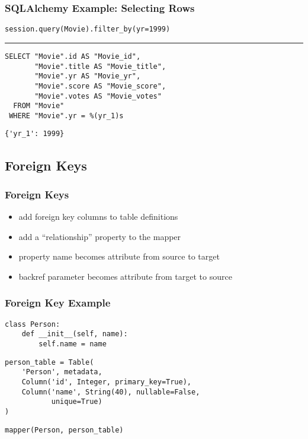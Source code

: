 \documentclass[dvipsnames]{beamer}
\theoremstyle{plain}
\begin{document}
\begin{frame}[fragile]
  \frametitle{SQLAlchemy Example: Selecting Rows}

  \begin{lstlisting}
session.query(Movie).filter_by(yr=1999)
  \end{lstlisting}
  \hrule

  \begin{lstlisting}[language=FullSQL]
SELECT "Movie".id AS "Movie_id",
       "Movie".title AS "Movie_title",
       "Movie".yr AS "Movie_yr",
       "Movie".score AS "Movie_score",
       "Movie".votes AS "Movie_votes"
  FROM "Movie"
 WHERE "Movie".yr = %(yr_1)s
  \end{lstlisting}

  \begin{lstlisting}
{'yr_1': 1999}
  \end{lstlisting}
\end{frame}

\subsection{Foreign Keys}

\begin{frame}
  \frametitle{Foreign Keys}

  \begin{itemize}
    \item add foreign key columns to table definitions
    \item add a ``relationship'' property to the mapper
    \item property name becomes attribute from source to target
    \item backref parameter becomes attribute from target to source
  \end{itemize}
\end{frame}

\begin{frame}[fragile]
  \frametitle{Foreign Key Example}

  \begin{lstlisting}
class Person:
    def __init__(self, name):
        self.name = name
  \end{lstlisting}

  \begin{lstlisting}
person_table = Table(
    'Person', metadata,
    Column('id', Integer, primary_key=True),
    Column('name', String(40), nullable=False,
           unique=True)
)
  \end{lstlisting}

  \begin{lstlisting}
mapper(Person, person_table)
  \end{lstlisting}
\end{frame}
\end{document}
